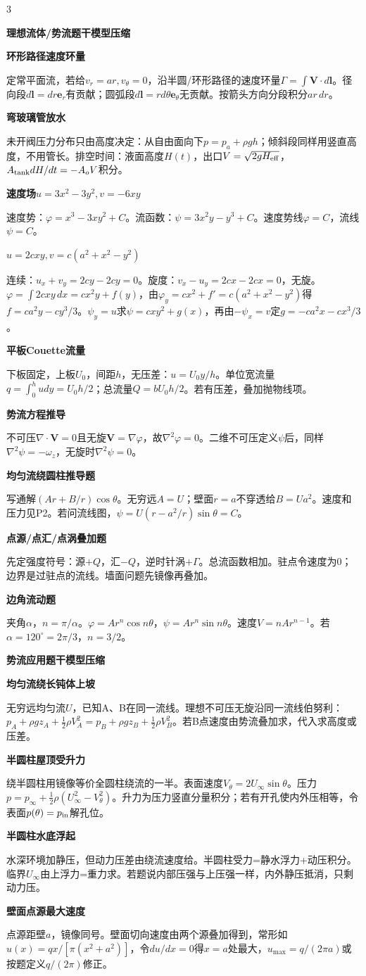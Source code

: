 \documentclass[a4paper]{article}
\newcommand{\qt}[1]{\vspace{0.25pt}\colorbox{Q}{\parbox{\dimexpr\linewidth-2\fboxsep}{\color{white}\bfseries #1}}\par}
\newcommand{\sect}[1]{\qt{#1}}
\begin{document}
\begin{multicols}{3}
{\sect{理想流体/势流题干模型压缩}
\sect{环形路径速度环量}
定常平面流，若给$v_r=ar,v_\theta=0$，沿半圆/环形路径的速度环量$\Gamma=\int\bm V\cdot d\bm l$。径向段$d\bm l=dr\bm e_r$有贡献；圆弧段$d\bm l=rd\theta\bm e_\theta$无贡献。按箭头方向分段积分$ar\,dr$。
\sect{弯玻璃管放水}
未开阀压力分布只由高度决定：从自由面向下$p=p_a+\rho gh$；倾斜段同样用竖直高度，不用管长。排空时间：液面高度$H(t)$，出口$V=\sqrt{2gH_{\rm eff}}$，$A_{\rm tank}dH/dt=-A_oV$积分。
\sect{速度场$u=3x^2-3y^2,v=-6xy$}
速度势：$\varphi=x^3-3xy^2+C$。流函数：$\psi=3x^2y-y^3+C$。速度势线$\varphi=C$，流线$\psi=C$。
\sect{$u=2cxy,v=c(a^2+x^2-y^2)$}
连续：$u_x+v_y=2cy-2cy=0$。旋度：$v_x-u_y=2cx-2cx=0$，无旋。$\varphi=\int2cxy\,dx=cx^2y+f(y)$，由$\varphi_y=cx^2+f'=c(a^2+x^2-y^2)$得$f=ca^2y-cy^3/3$。$\psi_y=u$求$\psi=cxy^2+g(x)$，再由$-\psi_x=v$定$g=-ca^2x-cx^3/3$。
\sect{平板Couette流量}
下板固定，上板$U_0$，间距$h$，无压差：$u=U_0y/h$。单位宽流量$q=\int_0^h udy=U_0h/2$；总流量$Q=bU_0h/2$。若有压差，叠加抛物线项。
\sect{势流方程推导}
不可压$\nabla\cdot\bm V=0$且无旋$\bm V=\nabla\varphi$，故$\nabla^2\varphi=0$。二维不可压定义$\psi$后，同样$\nabla^2\psi=-\omega_z$，无旋时$\nabla^2\psi=0$。
\sect{均匀流绕圆柱推导题}
写通解$(Ar+B/r)\cos\theta$。无穷远$A=U$；壁面$r=a$不穿透给$B=Ua^2$。速度和压力见P2。若问流线图，$\psi=U(r-a^2/r)\sin\theta=C$。
\sect{点源/点汇/点涡叠加题}
先定强度符号：源$+Q$，汇$-Q$，逆时针涡$+\Gamma$。总流函数相加。驻点令速度为0；边界是过驻点的流线。墙面问题先镜像再叠加。
\sect{边角流动题}
夹角$\alpha$，$n=\pi/\alpha$。$\varphi=Ar^n\cos n\theta$，$\psi=Ar^n\sin n\theta$。速度$V=nAr^{n-1}$。若$\alpha=120^\circ=2\pi/3$，$n=3/2$。

\sect{势流应用题干模型压缩}
\sect{均匀流绕长钝体上坡}
无穷远均匀流$U$，已知A、B在同一流线。理想不可压无旋沿同一流线伯努利：$p_A+\rho gz_A+\frac12\rho V_A^2=p_B+\rho gz_B+\frac12\rho V_B^2$。若B点速度由势流叠加求，代入求高度或压差。
\sect{半圆柱屋顶受升力}
绕半圆柱用镜像等价全圆柱绕流的一半。表面速度$V_\theta=2U_\infty\sin\theta$。压力$p=p_\infty+\frac12\rho(U_\infty^2-V_\theta^2)$。升力为压力竖直分量积分；若有开孔使内外压相等，令表面$p(\theta)=p_{\rm in}$解孔位。
\sect{半圆柱水底浮起}
水深环境加静压，但动力压差由绕流速度给。半圆柱受力=静水浮力+动压积分。临界$U_\infty$由上浮力=重力求。若题说内部压强与上压强一样，内外静压抵消，只剩动力压。
\sect{壁面点源最大速度}
点源距壁$a$，镜像同号。壁面切向速度由两个源叠加得到，常形如$u(x)=q x/[\pi(x^2+a^2)]$，令$du/dx=0$得$x=a$处最大，$u_{\max}=q/(2\pi a)$或按题定义$q/(2\pi)$修正。

}
\end{multicols}
\end{document}
